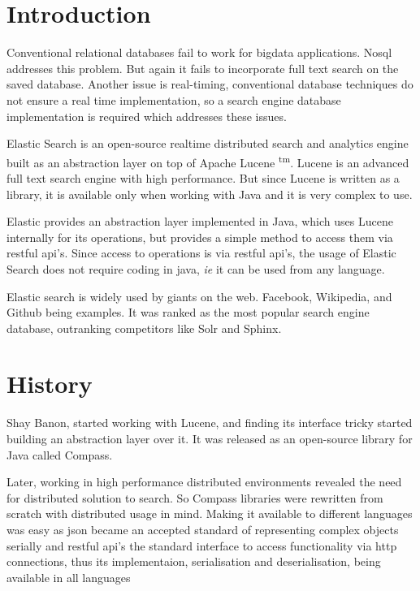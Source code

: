 \documentclass[12pt]{article}
\begin{document}
	\tableofcontents
	\newpage
	\listoffigures
	\newpage
	\printacronyms[include-classes=abbrev,name=Abbreviations]
	\newpage


	\renewcommand{\abstractname}{\Large Abstract}
	
	\newpage

	\section{Introduction}
		Conventional relational databases fail to work for bigdata applications. No\ac{sql} addresses this problem. But again it fails to incorporate full text search on the saved database. Another issue is real-timing, conventional database techniques do not ensure a real time implementation, so a search engine database implementation is required which addresses these issues.\cite{mine}

		Elastic Search is an open-source realtime distributed search and analytics engine built as an abstraction layer on top of Apache Lucene \textsuperscript{\ac{tm}}. Lucene is an advanced full text search engine with high performance. But since Lucene is written as a library, it is available only when working with Java and it is very complex to use.\cite{book} 

		Elastic provides an abstraction layer implemented in Java, which uses Lucene internally for its operations, but provides a simple method to access them via \ac{rest}ful \ac{api}'s. Since access to operations is via \ac{rest}ful \ac{api}'s, the usage of Elastic Search does not require coding in java, \emph{ie} it can be used from any language.

		Elastic search is widely used by giants on the web. Facebook, Wikipedia, and Github being examples. It was ranked as the most popular search engine database, outranking competitors like Solr and Sphinx.\cite{dbranking}

	\section{History}
		Shay Banon, started working with Lucene, and finding its interface tricky started building an abstraction layer over it. It was released as an open-source library for Java called Compass.\cite{book}

		Later, working in high performance distributed environments revealed the need for distributed solution to search. So Compass libraries were rewritten from scratch with distributed usage in mind. Making it available to different languages was easy as \ac{json} became an accepted standard of representing complex objects serially and \ac{rest}ful \ac{api}'s the standard interface to access functionality via \ac{http} connections, thus its implementaion, serialisation and deserialisation, being available in all languages
	
\end{document}
